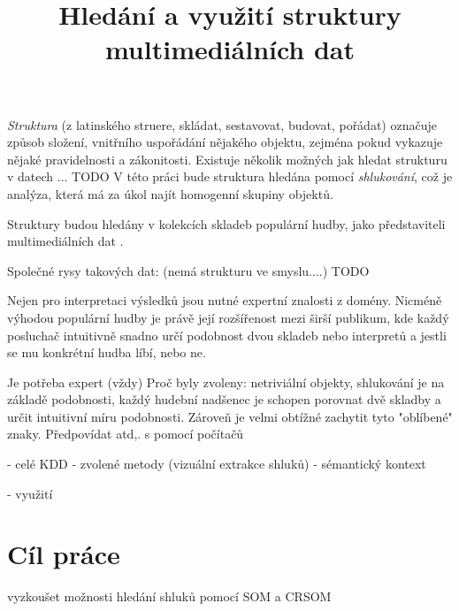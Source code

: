\documentclass[thesis=M,czech]{FITthesis}[2012/06/26]
\title{Hledání a využití struktury multimediálních dat}
\begin{document}
\renewcommand\listingscaption{Ukázka}

\begin{introduction}

\textit{Struktura} (z latinského struere, skládat, sestavovat, budovat, pořádat) označuje způsob složení, vnitřního uspořádání nějakého objektu, zejména pokud vykazuje nějaké pravidelnosti a zákonitosti. Existuje několik možných jak hledat strukturu v datech ... TODO
V této práci bude struktura hledána pomocí \textit{shlukování}, což je analýza, která má za úkol najít homogenní skupiny objektů. 

Struktury budou hledány v kolekcích skladeb populární hudby, jako představiteli multimediálních dat \cite{multimedia}. 

Společné rysy takových dat: (nemá strukturu ve smyslu....) TODO


Nejen pro interpretaci výsledků jsou nutné expertní znalosti z domény. Nicméně výhodou populární hudby je právě její rozšířenost mezi širší publikum, kde každý posluchač intuitivně snadno určí podobnost dvou skladeb nebo interpretů a jestli se mu konkrétní hudba líbí, nebo ne. 




Je potřeba expert (vždy)
Proč byly zvoleny: netriviální objekty, shlukování je na základě podobnosti, každý hudební nadšenec je schopen porovnat dvě skladby a určit intuitivní míru podobnosti. Zároveň je velmi obtížné zachytit tyto "oblíbené" znaky. Předpovídat atd,.  s pomocí počítačů


- celé KDD
- zvolené metody (vizuální extrakce shluků)
- sémantický kontext


- využití


	
	\section{Cíl práce}
	
	vyzkoušet možnosti hledání shluků pomocí SOM a CRSOM
\end{introduction}

\end{document}
